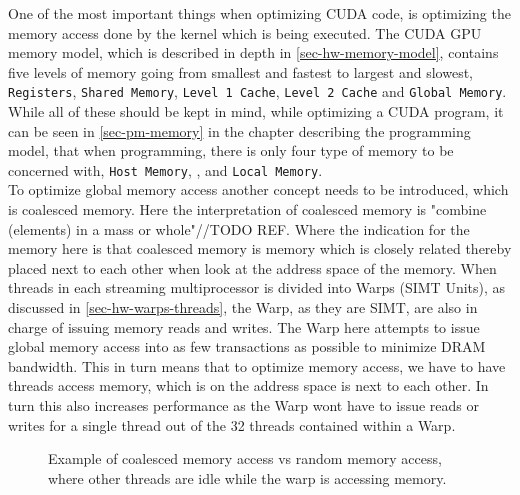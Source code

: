 One of the most important things when optimizing CUDA code, is optimizing the memory access done by the kernel which is being executed. The CUDA GPU memory model, which is described in depth in \cref{sec-hw-memory-model}, contains five levels of memory going from smallest and fastest to largest and slowest, \texttt{Registers}, \texttt{Shared Memory}, \texttt{Level 1 Cache}, \texttt{Level 2 Cache} and \texttt{Global Memory}. While all of these should be kept in mind, while optimizing a CUDA program, it can be seen in \cref{sec-pm-memory} in the chapter describing the programming model, that when programming, there is only four type of memory to be concerned with, \texttt{Host Memory}, ,  and \texttt{Local Memory}.\\
To optimize global memory access another concept needs to be introduced, which is coalesced memory. Here the interpretation of coalesced memory is "combine (elements) in a mass or whole"//TODO REF. Where the indication for the memory here is that coalesced memory is memory which is closely related thereby placed next to each other when look at the address space of the memory. When threads in each streaming multiprocessor is divided into Warps (SIMT Units), as discussed in \cref{sec-hw-warps-threads}, the Warp, as they are SIMT, are also in charge of issuing memory reads and writes. The Warp here attempts to issue global memory access into as few transactions as possible to minimize DRAM bandwidth. This in turn means that to optimize memory access, we have to have threads access memory, which is on the address space is next to each other. In turn this also increases performance as the Warp wont have to issue reads or writes for a single thread out of the 32 threads contained within a Warp.\\

\begin{figure}[ht]
	\centering
	\caption{Example of coalesced memory access vs random memory access, where other threads are idle while the warp is accessing memory.}
	\label{fig:coalesced_memory}
\end{figure}

